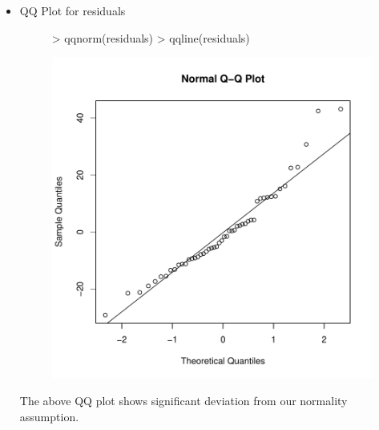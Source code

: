 \documentclass[12pt]{article}
\begin{document}
\clearpage
\begin{itemize}
\item QQ Plot for residuals
\begin{figure}[H]
\begin{Schunk}
\begin{Sinput}
> qqnorm(residuals)
> qqline(residuals)
\end{Sinput}
\end{Schunk}
\includegraphics{HW3-011}
\end{figure}
The above QQ plot shows significant deviation from our normality assumption.
\end{itemize}
\end{document}

